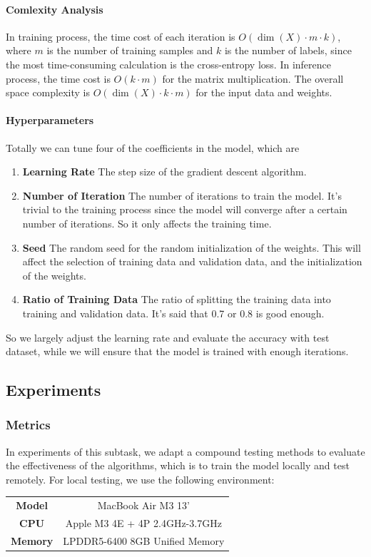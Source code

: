 \documentclass{article}
\begin{document}
\paragraph{Comlexity Analysis} In training process, the time cost of each iteration is $O(\dim(X) \cdot m \cdot k)$, where $m$ is the number of training samples and $k$ is the number of labels, since the most time-consuming calculation is the cross-entropy loss. In inference process, the time cost is $O(k\cdot m)$ for the matrix multiplication. The overall space complexity is $O(\dim(X) \cdot k \cdot m)$ for the input data and weights.

\paragraph{Hyperparameters} Totally we can tune four of the coefficients in the model, which are
\begin{enumerate}
    \item \textbf{Learning Rate} The step size of the gradient descent algorithm.
    \item \textbf{Number of Iteration} The number of iterations to train the model. It's trivial to the training process since the model will converge after a certain number of iterations. So it only affects the training time.
    \item \textbf{Seed} The random seed for the random initialization of the weights. This will affect the selection of training data and validation data, and the initialization of the weights.
    \item \textbf{Ratio of Training Data} The ratio of splitting the training data into training and validation data. It's said that 0.7 or 0.8 is good enough.
\end{enumerate}
So we largely adjust the learning rate and evaluate the accuracy with test dataset, while we will ensure that the model is trained with enough iterations.

\subsection{Experiments}

\subsubsection{Metrics}

In experiments of this subtask, we adapt a compound testing methods to evaluate the effectiveness of the algorithms, which is to train the model locally and test remotely. For local testing, we use the following environment:
\begin{table}[!htbp]
    \begin{center}
    \begin{tabular}[c]{cc}
        \textbf{Model} & MacBook Air M3 13' \\
        \textbf{CPU} & Apple M3 4E + 4P 2.4GHz-3.7GHz \\
        \textbf{Memory} & LPDDR5-6400 8GB Unified Memory
    \end{tabular}
    \end{center}
\end{table}
\end{document}
